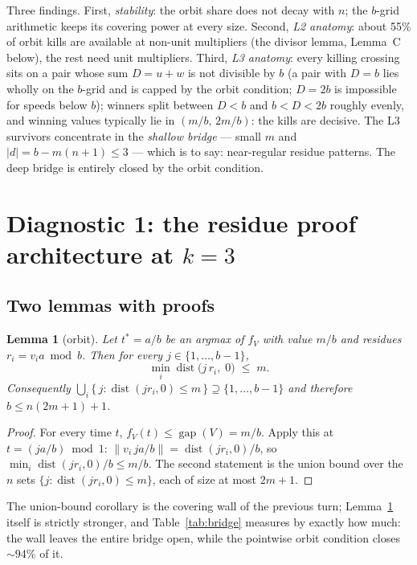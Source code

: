 \documentclass[11pt,a4paper]{article}
\theoremstyle{plain}
\newtheorem{lemma}[theorem]{Lemma}
\theoremstyle{definition}
\theoremstyle{remark}
\newcommand{\norm}[1]{\lVert #1 \rVert}
\newcommand{\gap}{\operatorname{gap}}
\newcommand{\dist}{\operatorname{dist}}
\begin{document}
Three findings. First, \emph{stability}: the orbit share does not decay with $n$; the
$b$-grid arithmetic keeps its covering power at every size. Second, \emph{L2 anatomy}:
about 55\% of orbit kills are available at non-unit multipliers (the divisor lemma,
Lemma~C below), the rest need unit multipliers. Third, \emph{L3 anatomy}: every killing
crossing sits on a pair whose sum $D = u + w$ is not divisible by $b$ (a pair with
$D = b$ lies wholly on the $b$-grid and is capped by the orbit condition; $D = 2b$ is
impossible for speeds below $b$); winners split between $D < b$ and $b < D < 2b$ roughly
evenly, and winning values typically lie in $(m/b,\, 2m/b)$: the kills are decisive.
The L3 survivors concentrate in the \emph{shallow bridge} --- small $m$ and
$|d| = b - m(n+1) \le 3$ --- which is to say: near-regular residue patterns. The deep
bridge is entirely closed by the orbit condition.

\section{Diagnostic 1: the residue proof architecture at \texorpdfstring{$k=3$}{k=3}}\label{sec:t1}

\subsection{Two lemmas with proofs}

\begin{lemma}[orbit]\label{lem:orbit}
Let $t^{*} = a/b$ be an argmax of $f_V$ with value $m/b$ and residues
$r_i = v_i a \bmod b$. Then for every $j \in \{1, \dots, b-1\}$,
\[
  \min_i \dist\!\big(j\, r_i,\; 0\big) \;\le\; m .
\]
Consequently $\bigcup_i \{\, j : \dist(j r_i, 0) \le m \,\} \supseteq \{1, \dots, b-1\}$
and therefore $b \le n(2m+1) + 1$.
\end{lemma}

\begin{proof}
For every time $t$, $f_V(t) \le \gap(V) = m/b$. Apply this at $t = (j a / b) \bmod 1$:
$\norm{v_i \, j a / b} = \dist(j r_i, 0)/b$, so $\min_i \dist(j r_i, 0)/b \le m/b$.
The second statement is the union bound over the $n$ sets
$\{j : \dist(j r_i, 0) \le m\}$, each of size at most $2m+1$.
\end{proof}

The union-bound corollary is the covering wall of the previous turn; Lemma~\ref{lem:orbit}
itself is strictly stronger, and Table~\ref{tab:bridge} measures by exactly how much:
the wall leaves the entire bridge open, while the pointwise orbit condition closes
$\sim$94\% of it.
\end{document}
